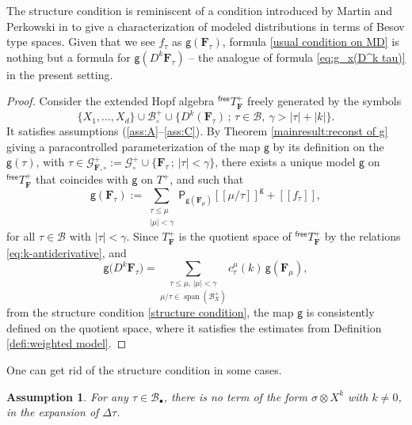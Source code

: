 \documentclass[10pt]{amsart}
\newcommand{\sbullet}{{\scriptscriptstyle\bullet}}
\DeclareMathOperator{\Span}{span}
\theoremstyle{plain}
\newtheorem{assumption}{Assumption}
\theoremstyle{definition}
\newcommand{\Brac}[1]{[\![#1]\!]}
\newcommand{\sfP}{\mathsf{P}}
\newcommand{\sfg}{\mathsf{g}}
\newcommand{\bsF}{\boldsymbol{F}}
\newcommand{\mcB}{\mathcal{B}}
\newcommand{\mcG}{\mathcal{G}}
\begin{document}
The structure condition is reminiscent of a condition introduced by Martin and Perkowski in \cite{MP18} to give a characterization of modeled distributions in terms of Besov type spaces. Given that we see $f_\tau$ as $\sfg({\bsF}_\tau)$, formula \eqref{usual condition on MD} is nothing but a formula for ${\sfg}(D^k{\bsF}_\tau)$ -- the analogue of formula \eqref{eq:g_x(D^k tau)} in the present setting.

\begin{proof}
Consider the extended Hopf algebra $^\textsf{free}T_{\bsF}^+$ freely generated by the symbols
\[
\{X_1,\dots,X_d\}\cup\mcB_\circ^+\cup\big\{D^k(\bsF_\tau)\,;\, \tau\in\mcB,\ \gamma>|\tau|+|k|\big\}.
\]
It satisfies assumptions (\ref{ass:A}--\ref{ass:C}).
By Theorem \ref{mainresult:reconst of g} giving a paracontrolled parameterization of the map $\sfg$ by its definition on the $\sfg(\tau)$, with $\tau\in\mcG^+_{\bsF,\circ} := \mcG^+_\circ\cup\big\{{\bsF}_\tau\,;\,\vert\tau\vert<\gamma\big\}$, there exists a unique model $\sfg$ on $^\textsf{free}T_{\bsF}^+$ that coincides with $\sfg$ on $T^+$, and such that
\[
\sfg(\bsF_\tau) := \sum_{\substack{\tau\le\mu\\|\mu|<\gamma}}\sfP_{\sfg(\bsF_\mu)}\Brac{\mu/\tau}^{\sfg} + \Brac{f_\tau},
\]
for all $\tau\in\mcB$ with $\vert\tau\vert<\gamma$. Since $T_{\bsF}^+$ is the quotient space of $^\textsf{free}T_{\bsF}^+$ by the relations \eqref{eq:k-antiderivative}, and
\[
\sfg\bigl(D^k\bsF_\tau\bigr) = \underset{\mu/\tau\in\Span (\mcB_X^+)}{\sum_{\tau\leq\mu, \,|\mu|<\gamma}} c_\tau^\mu(k)\,\sfg(\bsF_\mu),
\]
from the structure condition \eqref{structure condition}, the map $\sfg$ is consistently defined on the quotient space, where it satisfies the estimates from Definition \ref{defi:weighted model}.
\end{proof}

One can get rid of the structure condition in some cases.

\begin{assumption}\label{ass:D}
For any $\tau\in\mcB_\sbullet$, there is no term of the form $\sigma\otimes X^k$ with $k\neq0$, in the expansion of $\Delta\tau$.
\end{assumption}
\end{document}
